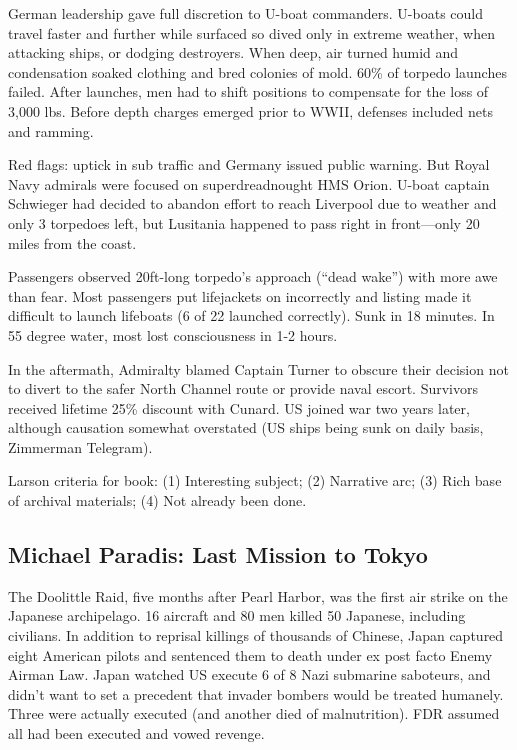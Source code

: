\documentclass[
]{article}
\begin{document}
German leadership gave full discretion to U-boat commanders. U-boats
could travel faster and further while surfaced so dived only in extreme
weather, when attacking ships, or dodging destroyers. When deep, air
turned humid and condensation soaked clothing and bred colonies of mold.
60\% of torpedo launches failed. After launches, men had to shift
positions to compensate for the loss of 3,000 lbs. Before depth charges
emerged prior to WWII, defenses included nets and ramming.

Red flags: uptick in sub traffic and Germany issued public warning. But
Royal Navy admirals were focused on superdreadnought HMS Orion. U-boat
captain Schwieger had decided to abandon effort to reach Liverpool due
to weather and only 3 torpedoes left, but Lusitania happened to pass
right in front---only 20 miles from the coast.

Passengers observed 20ft-long torpedo's approach (``dead wake'') with
more awe than fear. Most passengers put lifejackets on incorrectly and
listing made it difficult to launch lifeboats (6 of 22 launched
correctly). Sunk in 18 minutes. In 55 degree water, most lost
consciousness in 1-2 hours.

In the aftermath, Admiralty blamed Captain Turner to obscure their
decision not to divert to the safer North Channel route or provide naval
escort. Survivors received lifetime 25\% discount with Cunard. US joined
war two years later, although causation somewhat overstated (US ships
being sunk on daily basis, Zimmerman Telegram).

Larson criteria for book: (1) Interesting subject; (2) Narrative arc;
(3) Rich base of archival materials; (4) Not already been done.

\hypertarget{michael-paradis-last-mission-to-tokyo}{%
\subsection{Michael Paradis: Last Mission to
Tokyo}\label{michael-paradis-last-mission-to-tokyo}}

The Doolittle Raid, five months after Pearl Harbor, was the first air
strike on the Japanese archipelago. 16 aircraft and 80 men killed 50
Japanese, including civilians. In addition to reprisal killings of
thousands of Chinese, Japan captured eight American pilots and sentenced
them to death under ex post facto Enemy Airman Law. Japan watched US
execute 6 of 8 Nazi submarine saboteurs, and didn't want to set a
precedent that invader bombers would be treated humanely. Three were
actually executed (and another died of malnutrition). FDR assumed all
had been executed and vowed revenge.
\end{document}

